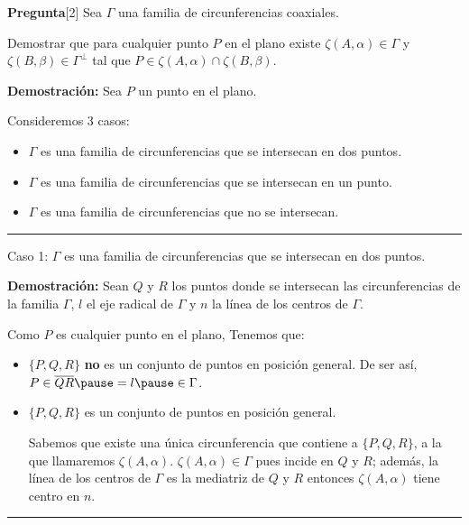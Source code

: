 \documentclass[12pt]{beamer}
\theoremstyle{definition}
\newenvironment{preg}{\begin{block}{\textbf{Pregunta}}}{\end{block}}
\newenvironment{dem}{\noindent\textbf{Demostración:}}{\begin{flushright}
\rule{1ex}{1ex} \end{flushright}}
\begin{document}
\begin{frame}
\begin{preg}[2]
Sea $\Gamma$ una familia de circunferencias coaxiales.

Demostrar que para cualquier punto $P$ en el plano existe $\zeta(A, \alpha) \in \Gamma$ y $\zeta(B,\beta) \in \Gamma^\bot$ tal que $P \in \zeta(A, \alpha) \cap \zeta(B,\beta)$.
\end{preg}
\pause

\begin{dem}
Sea $P$ un punto en el plano.

Consideremos 3 casos: 
\begin{itemize}
\item[Caso 1)] $\Gamma$ es una familia de circunferencias que se intersecan en dos puntos.
\item[Caso 2)] $\Gamma$ es una familia de circunferencias que se intersecan en un punto. 
\item[Caso 3)] $\Gamma$ es una familia de circunferencias que no se intersecan.
\end{itemize}
\vspace{2cm}
\end{dem}
\end{frame}

\begin{frame}{Caso 1: $\Gamma$ es una familia de circunferencias que se intersecan en dos puntos.}
\pause

\begin{dem} Sean $Q$ y $R$ los puntos donde se intersecan las circunferencias de la familia $\Gamma$, $l$ el eje radical de $\Gamma$ y $n$ la línea de los centros de $\Gamma$. 
\pause

Como $P$ es cualquier punto en el plano, Tenemos que:
\begin{itemize}
\item  $\{P, Q, R\}$ \textbf{no} es un conjunto de puntos en posición general. \pause De ser así, $P \in \overline{QR} \pause = l \pause \in \Gamma$.
\pause

\item $\{P, Q, R\}$ es un conjunto de puntos en posición general. 
\pause 

Sabemos que existe una única circunferencia que contiene a $\{P,Q,R\}$, a la que llamaremos $\zeta(A, \alpha)$. \pause $\zeta(A, \alpha) \in \Gamma$ pues incide en $Q$ y $R$; además, la línea de los centros de $\Gamma$ es la mediatriz de $Q$ y $R$ entonces $\zeta(A, \alpha)$ tiene centro en $n$.
\end{itemize}
\end{dem}
\end{frame}
\end{document}

